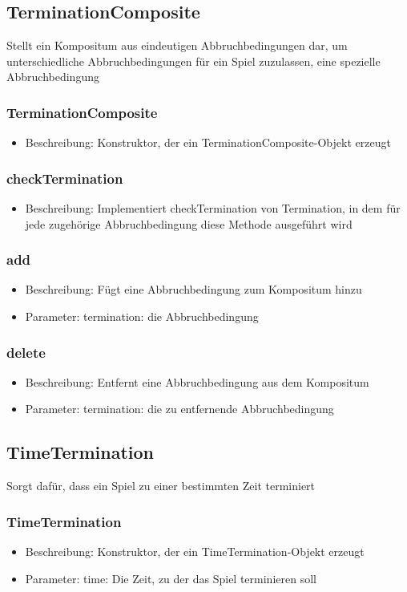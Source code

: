 \documentclass[a4paper]{scrreprt}
\begin{document}
	\subsection{TerminationComposite}
	Stellt ein Kompositum aus eindeutigen Abbruchbedingungen dar, um unterschiedliche Abbruchbedingungen für ein Spiel zuzulassen, eine spezielle Abbruchbedingung
	\subsubsection{TerminationComposite}
		\begin{itemize}
		\item Beschreibung: Konstruktor, der ein TerminationComposite-Objekt erzeugt
		\end{itemize}
	\subsubsection{checkTermination}
	\begin{itemize}
		\item Beschreibung: Implementiert checkTermination von Termination, in dem für jede zugehörige Abbruchbedingung diese Methode ausgeführt wird
	\end{itemize}
	\subsubsection{add}
	\begin{itemize}
		\item Beschreibung: Fügt eine Abbruchbedingung zum Kompositum hinzu
		\item Parameter: termination: die Abbruchbedingung
	\end{itemize}
	\subsubsection{delete}
	\begin{itemize}
		\item Beschreibung: Entfernt eine Abbruchbedingung aus dem Kompositum
		\item Parameter: termination: die zu entfernende Abbruchbedingung
	\end{itemize}


	\subsection{TimeTermination}
	Sorgt dafür, dass ein Spiel zu einer bestimmten Zeit terminiert
	\subsubsection{TimeTermination}
		\begin{itemize}
		\item Beschreibung: Konstruktor, der ein TimeTermination-Objekt erzeugt
		\item Parameter: time: Die Zeit, zu der das Spiel terminieren soll
		\end{itemize}
\end{document}
